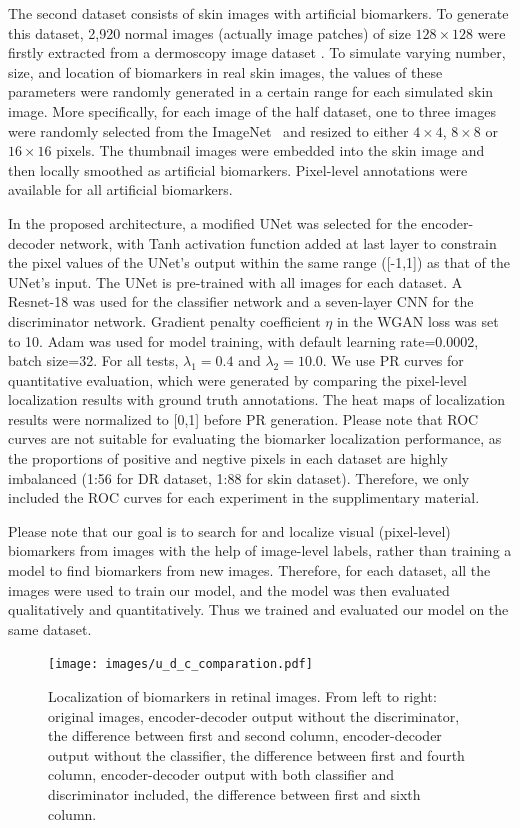 \documentclass[runningheads]{llncs}
\begin{document}
The second dataset consists of skin images with artificial biomarkers. To generate this dataset, 2,920 normal images (actually image patches) of size $128\times 128$ were firstly extracted from a dermoscopy image dataset \cite{codella2018skin}. To simulate varying number, size, and location of biomarkers in real skin images, the values of these parameters were randomly generated in a certain range for each simulated skin image. More specifically, for each image of the half dataset, one to three images were randomly selected from the ImageNet~\cite{deng2009imagenet} and resized to either $4\times 4$, $8\times 8$ or $16 \times 16$ pixels. The thumbnail images were embedded into the skin image and then locally smoothed as artificial biomarkers. Pixel-level annotations were available for all artificial biomarkers.
 
In the proposed architecture, a modified UNet \cite{ronneberger2015u} was selected for the encoder-decoder network, with Tanh activation function added at last layer to constrain the pixel values of the UNet's output within the same range ([-1,1]) as that of the UNet's input. The UNet is pre-trained with all images for each dataset. A Resnet-18 was used for the classifier network and a seven-layer CNN for the discriminator network. Gradient penalty coefficient $\eta$ in the WGAN loss was set to 10. Adam was used for model training, with default learning rate=0.0002, batch size=32. For all tests, $\lambda _1=0.4$ and $\lambda _2=10.0$. We use PR curves for quantitative evaluation, which were generated by comparing the pixel-level localization results with ground truth annotations. The heat maps of localization results were normalized to [0,1] before PR generation. Please note that ROC curves are not suitable for evaluating the biomarker localization performance, as the proportions of positive and negtive pixels in each dataset are highly imbalanced (1:56 for DR dataset, 1:88 for skin dataset). Therefore, we only included the ROC curves for each experiment in the supplimentary material.   

Please note that our goal is to search for and localize visual (pixel-level) biomarkers from images with the help of image-level labels, rather than training a model to find biomarkers from new images. Therefore, for each dataset, all the images were used to train our model, and the model was then evaluated qualitatively and quantitatively. Thus we trained and evaluated our model on the same dataset.

\begin{figure}%
	\centering
	\texttt{[image: images/u\_d\_c\_comparation.pdf]}
	\caption{Localization of biomarkers in retinal images. From left to right: original images, encoder-decoder output without the discriminator, the difference between first and second column, encoder-decoder output without the classifier, the difference between first and fourth column, encoder-decoder output with both classifier and discriminator included, the difference between first and sixth column.} \label{fig:model_components}
	\vspace{-0.5cm}
\end{figure} 
\end{document}
